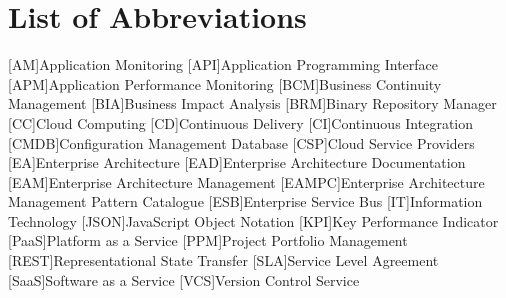 
\chapter*{List of Abbreviations}

\begin{acronym}[ewuifbwejkbfjksbjkcbsdjcjkn3j]%
[AM]{Application Monitoring}
[API]{Application Programming Interface}
[APM]{Application Performance Monitoring}
[BCM]{Business Continuity Management}
[BIA]{Business Impact Analysis}
[BRM]{Binary Repository Manager}
[CC]{Cloud Computing}
[CD]{Continuous Delivery}
[CI]{Continuous Integration}
[CMDB]{Configuration Management Database}
[CSP]{Cloud Service Providers}
[EA]{Enterprise Architecture}
[EAD]{Enterprise Architecture Documentation}
[EAM]{Enterprise Architecture Management}
[EAMPC]{Enterprise Architecture Management Pattern Catalogue}
[ESB]{Enterprise Service Bus}
[IT]{Information Technology}
[JSON]{JavaScript Object Notation}
[KPI]{Key Performance Indicator}
[PaaS]{Platform as a Service}
[PPM]{Project Portfolio Management}
[REST]{Representational State Transfer}
[SLA]{Service Level Agreement}
[SaaS]{Software as a Service}
[VCS]{Version Control Service}

%


\end{acronym}
